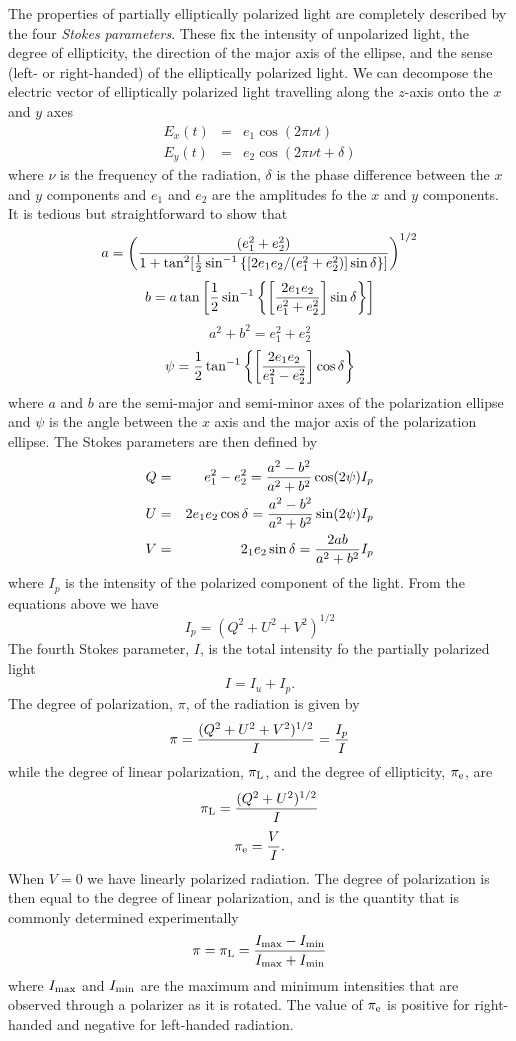 \documentclass{article}
\newcommand{\bua}{\begin{eqnarray*}}
\newcommand{\eua}{\end{eqnarray*}}
\begin{document}
The properties of partially elliptically polarized light are completely described by the 
four {\it Stokes parameters}. These fix the intensity of unpolarized light, the degree of ellipticity, the direction of the major axis of the ellipse, and the sense (left- or right-handed) of the elliptically polarized light. We can decompose the electric vector
of elliptically polarized light travelling along the $z$-axis onto the $x$ and $y$ axes
\bua
E_x(t)&=&e_1\cos(2\pi\nu t) \\
E_y(t)&=&e_2\cos(2\pi\nu t+\delta)
\eua
\noindent
where $\nu$ is the frequency of the radiation, $\delta$ is the phase difference between
the $x$ and $y$ components and $e_1$ and $e_2$ are the amplitudes fo the $x$ and $y$ components. It is tedious but straightforward to show that 
\[
a=\left({(e_1^2+e_2^2)\over 1+\tan^2[{1\over 2}\sin^{-1}\left\{[{2e_1e_2/(e_1^2+e_2^2)}]\sin\delta\right\}]}\right)^{1/2}
\]
\[
b=a\tan\left[{1\over 2}\sin^{-1}\left\{\left[{2e_1e_2\over e_1^2+e_2^2}\right]\sin\delta\right\}\right]
\]
\[
a^2+b^2=e_1^2+e_2^2
\]
\[
\psi={1\over 2}\tan^{-1}\left\{\left[2e_1e_2\over e_1^2-e_2^2\right]\cos\delta\right\}
\]
\noindent
where $a$ and $b$ are the semi-major and semi-minor axes of the polarization ellipse and $\psi$ is the angle between the $x$ axis and the major axis of the polarization ellipse. The Stokes parameters are then defined by 
\bua
Q&=&e_1^2-e_2^2={a^2-b^2\over a^2+b^2}\cos(2\psi)I_p \\
U&=&2e_1e_2\cos\delta={a^2-b^2\over a^2+b^2}\sin(2\psi)I_p \\
V&=&2_1e_2\sin\delta={2ab\over a^2+b^2}I_p
\eua
\noindent
where $I_p$ is the intensity of the polarized component of the light. From the equations 
above we have
\[
I_p=(Q^2+U^2+V^2)^{1/2}
\]
\noindent
The fourth Stokes parameter, $I$, is the total intensity fo the partially polarized light
\[
I=I_u+I_p.
\]
The degree of polarization, $\pi$, of the radiation is given by
\[
\pi={(Q^2+U^2+V^2)^{1/2}\over I}={I_p\over I}
\]
\noindent
while the degree of linear polarization, $\pi_{\rm L}$, and the degree of ellipticity, $\pi_{\rm e}$, are
\[
\pi_{\rm L}={(Q^2+U^2)^{1/2}\over I}
\]
\[
\pi_{\rm e}={V\over I}.
\]
\noindent
When $V=0$ we have linearly polarized radiation. The degree of polarization is then equal
to the degree of linear polarization, and is the quantity that is commonly determined experimentally
\[
\pi=\pi_{\rm L}={I_{\rm max}-I_{\rm min}\over I_{\rm max}+I_{\rm min}}
\] 
\noindent 
where $I_{\rm max}$ and $I_{\rm min}$ are the maximum and minimum intensities that are
observed through a polarizer as it is rotated. The value of $\pi_{\rm e}$ is positive for 
right-handed and negative for left-handed radiation.
\end{document}
